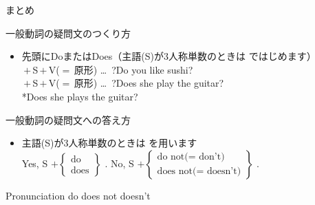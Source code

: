 \documentclass[aspectratio=169]{beamer}
\begin{document}
\begin{frame}[plain]{まとめ}
 

\begin{exampleblock}{一般動詞の疑問文のつくり方}\small
\begin{itemize}
 \item   先頭にDoまたはDoes（主語(S)が3人称単数のときは\,\,ではじめます）\\
	 \,$+$\,S\,$+$\,V{\scriptsize ($=$\,原形)} \ldots\,\,\,?\hfill{}Do you like sushi?\\
	 \,$+$\,S\,$+$\,V{\scriptsize ($=$\,原形)} \ldots\,\,\,?\hfill{}Does she play the guitar?\\
\hfill{}*Does she plays the guitar?
\end{itemize}
     \end{exampleblock}

\begin{exampleblock}{一般動詞の疑問文への答え方}
\small

\begin{itemize}
 \item 主語(S)が3人称単数のときは\,\,を用います\\
Yes, S $+ \left\{\begin{array}{l}
		  \text{do}\\
		\text{does}\end{array}\right\}$\,\,.
\hspace{20pt}
No, S $+ \left\{\begin{array}{l}
		  \text{do not($=$ don't)}\\
		\text{does not($=$ doesn't)}\end{array}\right\}$\,\,.
\end{itemize}
      \end{exampleblock}

\begin{exampleblock}{Pronunciation}
 do \hspace{15pt}does \hspace{15pt}not \hspace{15pt}doesn't 
\end{exampleblock}

\end{frame}
\end{document}
